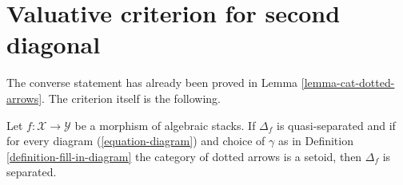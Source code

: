 \section{Valuative criterion for second diagonal}
\label{section-valuative-second}

\noindent
The converse statement has already been proved in
Lemma \ref{lemma-cat-dotted-arrows}.
The criterion itself is the following.

\begin{lemma}
\label{lemma-setoids-and-diagonal}
Let $f : \mathcal{X} \to \mathcal{Y}$ be a morphism of algebraic stacks.
If $\Delta_f$ is quasi-separated and if for every diagram
(\ref{equation-diagram}) and choice of $\gamma$ as in
Definition \ref{definition-fill-in-diagram}
the category of dotted arrows
is a setoid, then $\Delta_f$ is separated.
\end{lemma}

